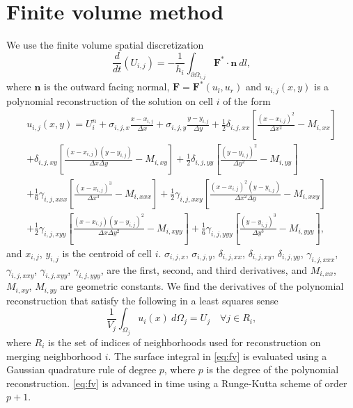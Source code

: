 
\section{Finite volume method}
We use the finite volume spatial discretization 
\begin{equation} \label{eq:fv}
\frac{d}{dt}(U_{i,j}) =  - \frac{1}{h_i} \int_{\partial \Omega_{i,j}} \mathbf{F}^* \cdot \mathbf{n}~dl,
\end{equation}
where $\mathbf{n}$ is the outward facing normal, $\mathbf{F} = \mathbf{F}^*(u_l,u_r)$ and $u_{i,j}(x,y)$ is a polynomial reconstruction of the solution on cell $i$ of the form
\begin{equation}\label{eq:u}
\begin{aligned}
	    u_{i,j}(x,y) = U^n_{i} +  \sigma_{i,j,x}\frac{x- x_{i,j}}{\Delta x} +   \sigma_{i,j,y}\frac{y- y_{i,j}}{\Delta y} + \frac{1}{2} \delta_{i,j, xx}\left[ \frac{(x -  x_{i,j})^2 }{\Delta x^2} -  M_{i,xx}\right]\\
	    + \delta_{i,j, xy}\left[ \frac{(x -  x_{i,j}) (y -  y_{i,j}) }{\Delta x \Delta y} -  M_{i,xy}\right] + \frac{1}{2} \delta_{i,j, yy}\left[ \frac{(y -  y_{i,j})^2 }{\Delta y^2} -   M_{i,yy}\right]\\
	     + \frac{1}{6}\gamma_{i,j, xxx}\left[ \frac{(x -  x_{i,j})^3 }{\Delta x^3} -  M_{i,xxx}\right] + \frac{1}{2}\gamma_{i,j, xxy}\left[ \frac{(x -  x_{i,j})^2 (y -  y_{i,j}) }{\Delta x^2 \Delta y} -  M_{i,xxy}\right]\\
	     + \frac{1}{2}\gamma_{i,j, xyy}\left[ \frac{(x -  x_{i,j}) (y -  y_{i,j})^2 }{\Delta x \Delta y ^2} -  M_{i,xyy}\right]+ \frac{1}{6}\gamma_{i,j, yyy}\left[ \frac{(y -  y_{i,j})^3 }{\Delta y^3} -  M_{i,yyy}\right],
\end{aligned}
\end{equation}
and $ x_{i,j}$, $ y_{i,j}$ is the centroid of cell $i$. $\sigma_{i,j,x}$, $ \sigma_{i,j,y}$, $ \delta_{i,j,xx}$, $ \delta_{i,j,xy}$, $ \delta_{i,j,yy}$, $ \gamma_{i,j,xxx}$, $ \gamma_{i,j,xxy}$, $ \gamma_{i,j,xyy}$, $ \gamma_{i,j,yyy}$, are the first, second, and third derivatives, and $  M_{i,xx}$, $ M_{i,xy}$,  $ M_{i,yy}$ are geometric constants. We find the derivatives of the polynomial reconstruction that satisfy the following in a least squares sense
\begin{equation}\label{eq:qi}
\frac{1}{ V_j}\int_{\Omega_j} u_i(x)~d\Omega_j = U_j \quad \forall j \in R_i,
\end{equation}
where $R_i$ is the set of indices of neighborhoods used for reconstruction on merging neighborhood $i$.  The surface integral in \eqref{eq:fv} is evaluated using a Gaussian quadrature rule of degree $p$, where $p$ is the degree of the polynomial reconstruction.  \eqref{eq:fv} is advanced in time using a Runge-Kutta scheme of order $p+1$.
